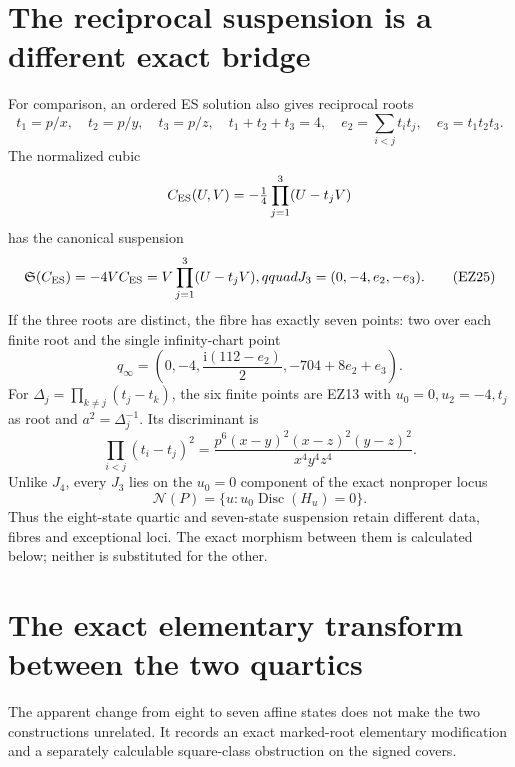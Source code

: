 \documentclass[11pt]{article}
\theoremstyle{definition}\newtheorem{definition}[theorem]{Definition}
\theoremstyle{remark}\newtheorem{remark}[theorem]{Remark}
\newcommand{\Disc}{\operatorname{Disc}}
\newcommand{\ii}{\mathrm i}
\begin{document}
\section{The reciprocal suspension is a different exact bridge}

For comparison, an ordered ES solution also gives reciprocal roots
\begin{equation}
 t_1=p/x,\quad t_2=p/y,\quad t_3=p/z,\quad
 t_1+t_2+t_3=4,\quad e_2=\sum_{i<j}t_it_j,\quad e_3=t_1t_2t_3. \tag{EZ24}
\end{equation}
The normalized cubic
\[
 C_{\rm ES}(U,V)=-\tfrac14\prod_{j=1}^3(U-t_jV)
\]
has the canonical suspension
\begin{equation}
 \mathfrak S(C_{\rm ES})=-4VC_{\rm ES}
 =V\prod_{j=1}^3(U-t_jV),qquad
 J_3=(0,-4,e_2,-e_3).                                  \tag{EZ25}
\end{equation}
If the three roots are distinct, the fibre has exactly seven points:
two over each finite root and the single infinity-chart point
\begin{equation}
 q_\infty=\left(0,-4,\frac{\ii(112-e_2)}2,
                         -704+8e_2+e_3\right).          \tag{EZ26}
\end{equation}
For \(\Delta_j=\prod_{k\ne j}(t_j-t_k)\), the six finite points are EZ13
with \(u_0=0,u_2=-4,t_j\) as root and \(a^2=\Delta_j^{-1}\).
Its discriminant is
\begin{equation}
 \prod_{i<j}(t_i-t_j)^2
 =\frac{p^6(x-y)^2(x-z)^2(y-z)^2}{x^4y^4z^4}.           \tag{EZ27}
\end{equation}
Unlike \(J_4\), every \(J_3\) lies on the \(u_0=0\) component of the exact
nonproper locus
\begin{equation}
 \mathcal N(P)=\{u:u_0\Disc(H_u)=0\}.                  \tag{EZ28}
\end{equation}
Thus the eight-state quartic and seven-state suspension retain different data,
fibres and exceptional loci.  The exact morphism between them is calculated
below; neither is substituted for the other.

\section{The exact elementary transform between the two quartics}

The apparent change from eight to seven affine states does not make the two
constructions unrelated.  It records an exact marked-root elementary
modification and a separately calculable square-class obstruction on the
signed covers.
\end{document}

